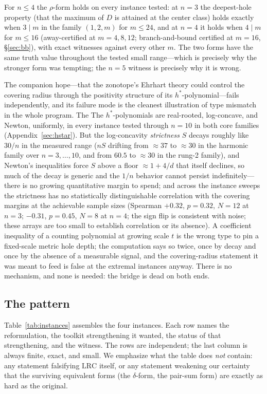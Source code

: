 \documentclass[11pt,a4paper]{article}
\numberwithin{equation}{section}
\theoremstyle{plain}
\theoremstyle{definition}
\theoremstyle{remark}
\newcommand{\lrc}{\mathrm{LRC}}
\begin{document}
For $n\le4$ the $\rho$-form holds on every instance tested: at $n=3$
the deepest-hole property (that the maximum of $D$ is attained at the
center class) holds exactly when $3\mid m$ in the family
$(1,2,m)$ for $m\le24$, and at $n=4$ it holds when $4\mid m$ for
$m\le16$ (away-certified at $m=4,8,12$; branch-and-bound certified at
$m=16$, \S\ref{sec:bb}), with exact witnesses against every other $m$.
The two forms have the same truth value throughout the tested small
range---which is precisely why the stronger form was tempting; the
$n=5$ witness is precisely why it is wrong.

The companion hope---that the zonotope's Ehrhart theory could control
the covering radius through the positivity structure of its
$h^*$-polynomial---fails independently, and its failure mode is the
cleanest illustration of type mismatch in the whole program. The
The $h^*$-polynomials are real-rooted, log-concave, and Newton, uniformly,
in every instance tested through $n=10$ in both core families
(Appendix~\ref{sec:hstar}). But the log-concavity \emph{strictness} $S$
decays roughly like $30/n$ in the measured range ($nS$ drifting from
$\approx37$ to $\approx30$ in the harmonic family over
$n=3,\dots,10$, and from $60.5$ to $\approx30$ in the rung-2 family),
and Newton's inequalities force $S$ above a floor $\approx1+4/d$ that
itself declines, so much of the decay is generic and the $1/n$ behavior
cannot persist indefinitely---there is no growing quantitative margin to
spend; and across the instance sweeps the strictness has no
statistically distinguishable correlation with the covering margins at
the achievable sample sizes (Spearman $+0.32$, $p=0.32$, $N=12$ at
$n=3$; $-0.31$, $p=0.45$, $N=8$ at $n=4$; the sign flip is consistent
with noise; these arrays are too small to establish correlation or its
absence). A
coefficient inequality of a counting polynomial at growing scale $t$ is
the wrong type to pin a fixed-scale metric hole depth; the computation
says so twice, once by decay and once by the absence of a measurable
signal, and the covering-radius statement it was meant to feed is false
at the extremal instances anyway. There is no mechanism, and none is
needed: the bridge is dead on both ends.

\subsection{The pattern}

Table~\ref{tab:instances} assembles the four instances. Each row names
the reformulation, the toolkit strengthening it wanted, the status of
that strengthening, and the witness. The rows are independent; the last
column is always finite, exact, and small. We emphasize what the table
does \emph{not} contain: any statement falsifying $\lrc$ itself, or any
statement weakening our certainty that the surviving equivalent forms
(the $\delta$-form, the pair-sum form) are exactly as hard as the
original.
\end{document}
